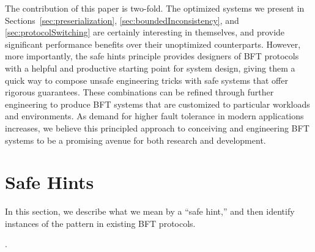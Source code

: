 \documentclass[twocolumn,10pt]{article}
\begin{document}
The contribution of this paper is two-fold.  The optimized systems we
present in Sections~\ref{sec:preserialization}, \ref{sec:boundedInconsistency}, and
\ref{sec:protocolSwitching} are certainly interesting in themselves, and provide
significant performance benefits over their unoptimized counterparts.
However, more importantly, the safe hints principle provides designers
of BFT protocols with a helpful and productive starting point for system
design, giving them a quick way to compose unsafe engineering tricks
with safe systems that offer rigorous guarantees. These combinations
can be refined through further engineering to produce BFT systems that
are customized to particular workloads and environments.  
As demand for higher fault tolerance in modern applications increases,
we believe this principled approach to conceiving and engineering BFT
systems to be a promising avenue for both research and development.





\section{Safe Hints}
\label{sec:safeHints}

In this section, we describe what we mean by a ``safe hint,'' and then
identify instances of the pattern in existing BFT protocols.




%
.
\end{document}
